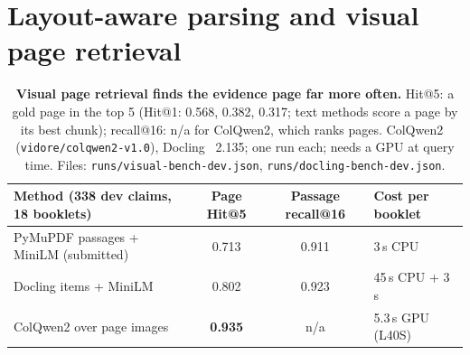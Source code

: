 \documentclass[10pt,a4paper]{article}
\begin{document}
\section{Layout-aware parsing and visual page retrieval}\label{app:visual}
\begin{table}[H]
\centering\footnotesize
\begin{tabular}{@{}lccl@{}}
\toprule
Method (338 dev claims, 18 booklets) & Page Hit@5 & Passage recall@16 & Cost per booklet \\
\midrule
PyMuPDF passages + MiniLM (submitted) & 0.713 & 0.911 & 3\,s CPU \\
Docling items + MiniLM & 0.802 & 0.923 & 45\,s CPU + 3\,s \\
ColQwen2 over page images & \textbf{0.935} & n/a & 5.3\,s GPU (L40S) \\
\bottomrule
\end{tabular}
\caption{\textbf{Visual page retrieval finds the evidence page far more often.} Hit@5: a gold page in
the top 5 (Hit@1: 0.568, 0.382, 0.317; text methods score a page by its best chunk); recall@16: n/a for
ColQwen2, which ranks pages. ColQwen2~\cite{faysse2024colpali} (\texttt{vidore/colqwen2-v1.0}), Docling~\cite{auer2024docling}
2.135; one run each; needs a GPU at query time. Files: \texttt{runs/visual-bench-dev.json},
\texttt{runs/docling-bench-dev.json}.}
\label{tab:visual}
\end{table}
\end{document}
